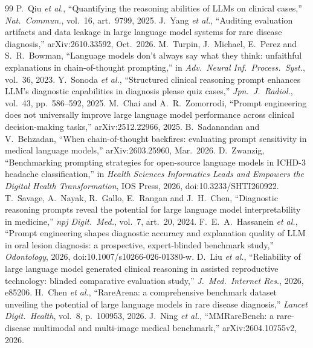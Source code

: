 \IfFileExists{IEEEtran.cls}{\ieeetrue\documentclass[conference]{IEEEtran}}{\ieeefalse\documentclass[10pt,twocolumn,letterpaper]{article}}
\begin{document}
\begin{thebibliography}{99}
 P.~Qiu \emph{et al.}, ``Quantifying the reasoning abilities of LLMs on clinical cases,'' \emph{Nat.\ Commun.}, vol.~16, art.~9799, 2025.
 J.~Yang \emph{et al.}, ``Auditing evaluation artifacts and data leakage in large language model systems for rare disease diagnosis,'' arXiv:2610.33592, Oct.\ 2026.
 M.~Turpin, J.~Michael, E.~Perez and S.~R.~Bowman, ``Language models don't always say what they think: unfaithful explanations in chain-of-thought prompting,'' in \emph{Adv.\ Neural Inf.\ Process.\ Syst.}, vol.~36, 2023.
 Y.~Sonoda \emph{et al.}, ``Structured clinical reasoning prompt enhances LLM's diagnostic capabilities in diagnosis please quiz cases,'' \emph{Jpn.\ J.\ Radiol.}, vol.~43, pp.~586--592, 2025.
 M.~Chai and A.~R.~Zomorrodi, ``Prompt engineering does not universally improve large language model performance across clinical decision-making tasks,'' arXiv:2512.22966, 2025.
 B.~Sadanandan and V.~Behzadan, ``When chain-of-thought backfires: evaluating prompt sensitivity in medical language models,'' arXiv:2603.25960, Mar.\ 2026.
 D.~Zwanzig, ``Benchmarking prompting strategies for open-source language models in ICHD-3 headache classification,'' in \emph{Health Sciences Informatics Leads and Empowers the Digital Health Transformation}, IOS Press, 2026, doi:10.3233/SHTI260922.
 T.~Savage, A.~Nayak, R.~Gallo, E.~Rangan and J.~H.~Chen, ``Diagnostic reasoning prompts reveal the potential for large language model interpretability in medicine,'' \emph{npj Digit.\ Med.}, vol.~7, art.~20, 2024.
 F.~E.~A.~Hassanein \emph{et al.}, ``Prompt engineering shapes diagnostic accuracy and explanation quality of LLM in oral lesion diagnosis: a prospective, expert-blinded benchmark study,'' \emph{Odontology}, 2026, doi:10.1007/s10266-026-01380-w.
 D.~Liu \emph{et al.}, ``Reliability of large language model generated clinical reasoning in assisted reproductive technology: blinded comparative evaluation study,'' \emph{J.\ Med.\ Internet Res.}, 2026, e85206.
 H.~Chen \emph{et al.}, ``RareArena: a comprehensive benchmark dataset unveiling the potential of large language models in rare disease diagnosis,'' \emph{Lancet Digit.\ Health}, vol.~8, p.~100953, 2026.
 J.~Ning \emph{et al.}, ``MMRareBench: a rare-disease multimodal and multi-image medical benchmark,'' arXiv:2604.10755v2, 2026.

\end{thebibliography}
\end{document}
